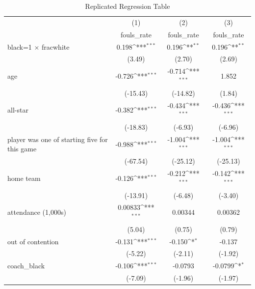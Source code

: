 \begin{table}[htbp]\centering
\def\sym#1{\ifmmode^{#1}\else\(^{#1}\)\fi}
\caption{Replicated Regression Table \label{tab2}}
\begin{tabular}{l*{3}{c}}
\hline\hline
                    &\multicolumn{1}{c}{(1)}&\multicolumn{1}{c}{(2)}&\multicolumn{1}{c}{(3)}\\
                    &\multicolumn{1}{c}{fouls\_rate}&\multicolumn{1}{c}{fouls\_rate}&\multicolumn{1}{c}{fouls\_rate}\\
\hline
black=1 $\times$ fracwhite&       0.198\sym{***}&       0.196\sym{**} &       0.196\sym{**} \\
                    &      (3.49)         &      (2.70)         &      (2.69)         \\
[1em]
age                 &      -0.726\sym{***}&      -0.714\sym{***}&       1.852         \\
                    &    (-15.43)         &    (-14.82)         &      (1.84)         \\
[1em]
all-star            &      -0.382\sym{***}&      -0.434\sym{***}&      -0.436\sym{***}\\
                    &    (-18.83)         &     (-6.93)         &     (-6.96)         \\
[1em]
player was one of starting five for this game&      -0.988\sym{***}&      -1.004\sym{***}&      -1.004\sym{***}\\
                    &    (-67.54)         &    (-25.12)         &    (-25.13)         \\
[1em]
home team           &      -0.126\sym{***}&      -0.212\sym{***}&      -0.142\sym{***}\\
                    &    (-13.91)         &     (-6.48)         &     (-3.40)         \\
[1em]
attendance (1,000s) &     0.00833\sym{***}&     0.00344         &     0.00362         \\
                    &      (5.04)         &      (0.75)         &      (0.79)         \\
[1em]
out of contention   &      -0.131\sym{***}&      -0.150\sym{*}  &      -0.137         \\
                    &     (-5.22)         &     (-2.11)         &     (-1.92)         \\
[1em]
coach\_black         &      -0.106\sym{***}&     -0.0793         &     -0.0799\sym{*}  \\
                    &     (-7.09)         &     (-1.96)         &     (-1.97)         \\

\end{tabular}
\end{table}
